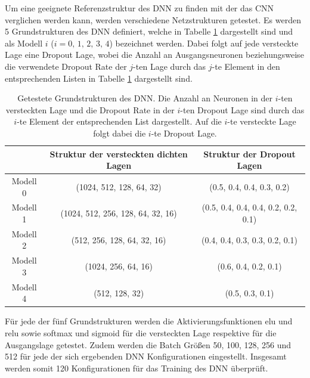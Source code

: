 Um eine geeignete Referenzstruktur des DNN zu finden mit der das CNN verglichen werden kann, werden verschiedene Netzstrukturen getestet. Es werden 5 Grundstrukturen des DNN definiert, welche in Tabelle \ref{tab:DNNstruk} dargestellt sind und als Modell $i$ ($i = 0,\,1,\,2,\,3,\,4$) bezeichnet werden. Dabei folgt auf jede versteckte Lage eine Dropout Lage, wobei die Anzahl an Ausgangsneuronen beziehungsweise die verwendete Dropout Rate der $j$-ten Lage durch das $j$-te Element in den entsprechenden Listen in Tabelle \ref{tab:DNNstruk} dargestellt sind. \\
\captionsetup[table]{name=Tabelle}
\begin{table}[!b]
\centering
\caption{Getestete Grundstrukturen des DNN. Die Anzahl an Neuronen in der $i$-ten versteckten Lage und die Dropout Rate in der $i$-ten Dropout Lage sind durch das $i$-te Element der entsprechenden List dargestellt. Auf die $i$-te versteckte Lage folgt dabei die $i$-te Dropout Lage.}
\label{tab:DNNstruk}
 \begin{tabular}{c|c|c}
 & Struktur der versteckten dichten Lagen & Struktur der Dropout Lagen \\
 \hline
 Modell 0 & (1024, 512, 128, 64, 32) & (0.5, 0.4, 0.4, 0.3, 0.2) \\
 Modell 1 & (1024, 512, 256, 128, 64, 32, 16) & (0.5, 0.4, 0.4, 0.4, 0.2, 0.2, 0.1)\\
 Modell 2 & (512, 256, 128, 64, 32, 16) & (0.4, 0.4, 0.3, 0.3, 0.2, 0.1)\\
 Modell 3 & (1024, 256, 64, 16) & (0.6, 0.4, 0.2, 0.1)\\
 Modell 4 & (512, 128, 32) &  (0.5, 0.3, 0.1)\\
 \end{tabular}
\end{table}
Für jede der fünf Grundstrukturen werden die Aktivierungsfunktionen elu und relu sowie softmax und sigmoid für die versteckten Lage respektive für die Ausgangslage getestet. Zudem werden die Batch Grö{\ss}en 50, 100, 128, 256 und 512 für jede der sich ergebenden DNN Konfigurationen eingestellt. Insgesamt werden somit 120 Konfigurationen für das Training des DNN überprüft. \\
